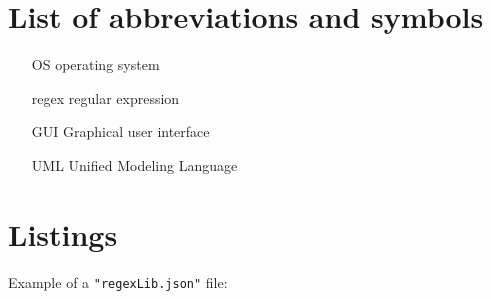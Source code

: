 \documentclass[a4paper,twoside,12pt]{book}
\begin{document}
\begin{appendices} 


 

\chapter*{List of abbreviations and symbols}

\begin{itemize}
\item[OS] operating system
\item[regex] regular expression
\item[GUI] Graphical user interface
\item[UML] Unified Modeling Language 
\end{itemize}


\chapter*{Listings}

   
Example of a \lstinline|"regexLib.json"| file:


\end{appendices}
\end{document}
